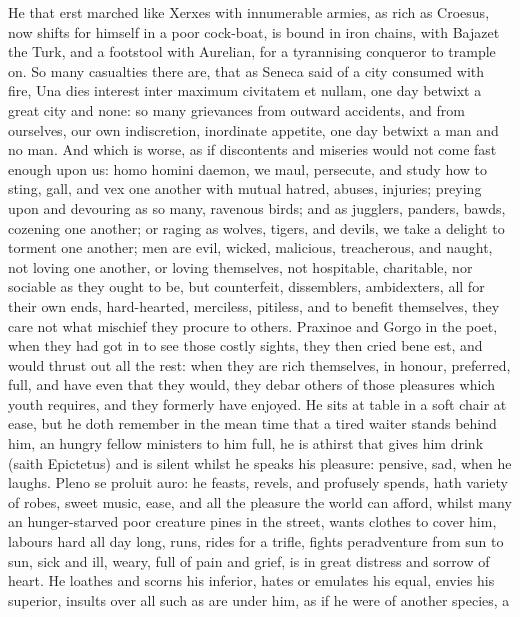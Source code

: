 {He that erst marched like Xerxes with innumerable armies, as rich as
Croesus, now shifts for himself in a poor cock-boat, is bound in iron
chains, with Bajazet the Turk, and a footstool with Aurelian, for a
tyrannising conqueror to trample on. So many casualties there are, that
as Seneca said of a city consumed with fire, Una dies interest inter
maximum civitatem et nullam, one day betwixt a great city and none: so
many grievances from outward accidents, and from ourselves, our own
indiscretion, inordinate appetite, one day betwixt a man and no man.
And which is worse, as if discontents and miseries would not come fast
enough upon us: homo homini daemon, we maul, persecute, and study how
to sting, gall, and vex one another with mutual hatred, abuses,
injuries; preying upon and devouring as so many, ravenous birds;
and as jugglers, panders, bawds, cozening one another; or raging as
wolves, tigers, and devils, we take a delight to torment one
another; men are evil, wicked, malicious, treacherous, and
naught, not loving one another, or loving themselves, not
hospitable, charitable, nor sociable as they ought to be, but
counterfeit, dissemblers, ambidexters, all for their own ends,
hard-hearted, merciless, pitiless, and to benefit themselves, they care
not what mischief they procure to others. Praxinoe and Gorgo in
the poet, when they had got in to see those costly sights, they then
cried bene est, and would thrust out all the rest: when they are rich
themselves, in honour, preferred, full, and have even that they would,
they debar others of those pleasures which youth requires, and they
formerly have enjoyed. He sits at table in a soft chair at ease, but he
doth remember in the mean time that a tired waiter stands behind him,
an hungry fellow ministers to him full, he is athirst that gives him
drink (saith Epictetus) and is silent whilst he speaks his
pleasure: pensive, sad, when he laughs. Pleno se proluit auro: he
feasts, revels, and profusely spends, hath variety of robes, sweet
music, ease, and all the pleasure the world can afford, whilst many an
hunger-starved poor creature pines in the street, wants clothes to
cover him, labours hard all day long, runs, rides for a trifle, fights
peradventure from sun to sun, sick and ill, weary, full of pain and
grief, is in great distress and sorrow of heart. He loathes and scorns
his inferior, hates or emulates his equal, envies his superior, insults
over all such as are under him, as if he were of another species, a
}
